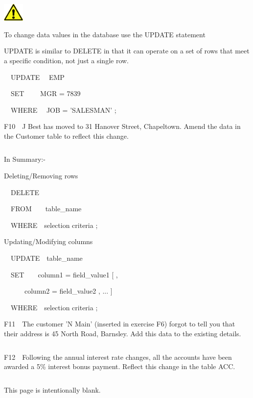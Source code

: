 \begin{center}
  
\includegraphics[width=1.048cm,height=0.903cm]{images/img (2).png}

\end{center}
To change data values in the database use the UPDATE statement 

UPDATE is similar to DELETE in that it can operate on a set of rows that meet a specific condition, not just a single row.

\ \ UPDATE \ \ EMP

\ \ SET \ \ \ \ MGR = 7839

\ \ WHERE \ \ JOB = 'SALESMAN' ;

F10\ \ J Best has moved to 31 Hanover Street, Chapeltown.  Amend the data in the Customer table to reflect this change.

\begin{flushleft}
\tablefirsthead{}
\tablehead{}
\tabletail{}
\tablelasttail{}
\begin{supertabular}{|m{14.663cm}|}
\hline
\\\hline
\end{supertabular}
\end{flushleft}
In Summary:-

Deleting/Removing rows\ \ 

\ \ DELETE

\ \ FROM\ \ \ \ table\_name

\ \ WHERE\ \ selection criteria ;

Updating/Modifying columns\ \ 

\ \ UPDATE\ \ table\_name

\ \ SET\ \ \ \ column1 = field\_value1 [ ,

\ \ \ \ \ \ column2 = field\_value2 ,  ... ]

\ \ WHERE\ \ selection criteria ;

F11\ \ The customer 'N Main' (inserted in exercise F6) forgot to tell you that their address is 45 North Road, Barnsley.  Add this data to the existing details.  

\begin{flushleft}
\tablefirsthead{}
\tablehead{}
\tabletail{}
\tablelasttail{}
\begin{supertabular}{|m{14.663cm}|}
\hline
\\\hline
\end{supertabular}
\end{flushleft}
F12\ \ Following the annual interest rate changes, all the accounts have been awarded a 5\% interest bonus payment.  Reflect this change in the table ACC.

\begin{flushleft}
\tablefirsthead{}
\tablehead{}
\tabletail{}
\tablelasttail{}
\begin{supertabular}{|m{14.663cm}|}
\hline
\\\hline
\end{supertabular}
\end{flushleft}
This page is intentionally blank.